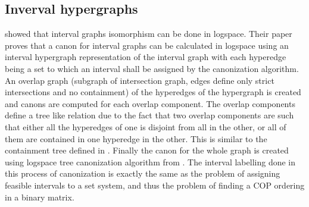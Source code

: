 \documentclass{llncs}
\begin{document}
\noindent
\subsection{Inverval hypergraphs}
\cite{kklv10} showed that interval graphs isomorphism can be done in
logspace. Their paper proves that a canon for interval graphs can be
calculated in logspace using an interval hypergraph representation of the
interval graph with each hyperedge being a set to which an interval shall be
assigned by the canonization algorithm. An overlap graph (subgraph of
intersection graph, edges define only strict intersections and no
containment) of the hyperedges of the hypergraph is created and canons
are computed for each overlap component. The overlap components define
a tree like relation due to the fact that two overlap components are
such that either all the hyperedges of one is disjoint from all in the other,
or all of them are contained in one hyperedge in the other. This is
similar to the containment tree defined in \cite{nsnrs09}. Finally the
canon for the whole graph is created using logspace tree canonization
algorithm from \cite{sl92}. The interval labelling done in this
process of canonization is exactly the same as the problem of
assigning feasible intervals to a set system, and thus the problem of
finding a COP ordering in a binary matrix\cite{nsnrs09}.
\end{document}
